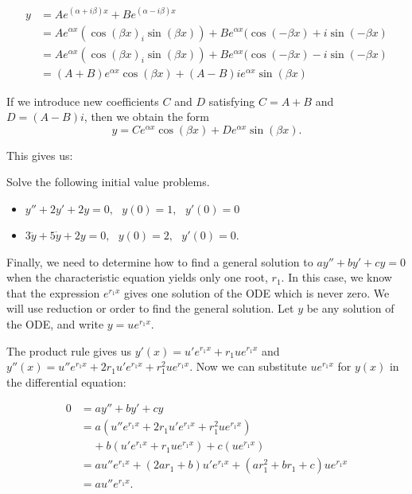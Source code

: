 \documentclass[12pt,letterpaper,twoside]{amsart}
\newcounter{exercise}
\newcounter{problem}
\newcommand{\exercise}{\bigskip \noindent {\large {\sc Exercise \arabic{exercise}:}} \addtocounter{exercise}{1}}
\begin{document}
\begin{align*} 
y & = A e^{(\alpha+i\beta)x}+Be^{(\alpha-i\beta)x} \\
& = Ae^{\alpha x}(\cos(\beta x)_i\sin(\beta x)) + Be^{\alpha x}(\cos(-\beta x)+i\sin(-\beta x) \\
& = Ae^{\alpha x}(\cos(\beta x)_i\sin(\beta x)) + Be^{\alpha x}(\cos(-\beta x)-i\sin(-\beta x) \\
& = (A+B)e^{\alpha x}\cos(\beta x)+(A-B)ie^{\alpha x}\sin(\beta x)
\end{align*}

If we introduce new coefficients $C$ and $D$ satisfying $C=A+B$ and $D=(A-B)i$, then we obtain the form
\[ y = Ce^{\alpha x}\cos(\beta x)+De^{\alpha x}\sin(\beta x).\]

This gives us:

\begin{center}
\end{center}


\exercise Solve the following initial value problems.
\begin{itemize}
\item $y''+2y'+2y=0, \ \ \ y(0)=1, \ \ \ y'(0)=0$
\item $3\ddot{y}+5\dot{y} +2y=0, \ \ \ y(0)=2, \ \ \ y'(0)=0$.
\end{itemize}


Finally, we need to determine how to find a general solution to $ay''+by'+cy=0$ when the characteristic equation yields only one root, $r_1$.  In this case, we know that the expression $e^{r_1x}$ gives one solution of the ODE which is never zero.  We will use reduction or order to find the general solution.  Let $y$ be any solution of the ODE, and write $y=ue^{r_1x}$.

The product rule gives us $y'(x)=u'e^{r_1x}+r_1ue^{r_1x}$ and $y''(x)=u''e^{r_1x} + 2r_1u'e^{r_1x}+r_1^2ue^{r_1x}$.  Now we can substitute $ue^{r_1x}$ for $y(x)$ in the differential equation:

\begin{align*}
0 & = ay''+by'+cy \\
& = a(u''e^{r_1x} + 2r_1u'e^{r_1x}+r_1^2ue^{r_1x}) \\
& \ \ \ \ \ + b(u'e^{r_1x}+r_1ue^{r_1x}) + c(ue^{r_1x}) \\
& = au''e^{r_1x} + (2ar_1+b)u'e^{r_1x} +(ar_1^2+br_1+c)ue^{r_1x} \\
& = au''e^{r_1x}.
\end{align*}
\end{document}
